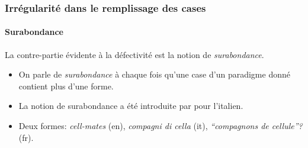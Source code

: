 \begin{frame}
\frametitle{Irrégularité dans le remplissage des cases}
\framesubtitle{Surabondance}
La contre-partie évidente à la défectivité est la notion de {\em
  surabondance}. 
\begin{itemize}
\item On parle de {\em surabondance} à chaque fois qu'une
case d'un paradigme donné contient plus d'une forme.
\item La notion de
surabondance a été introduite par \cite{thornton10} pour
l'italien.
\item Deux formes: {\em cell-mates} (en), {\em compagni di cella} (it),{\em
    ``compagnons de cellule''?} (fr).
\end{itemize}

\pause
\begin{table}\centering
{}
\label{tbl:italian}
\end{table}
\end{frame}







